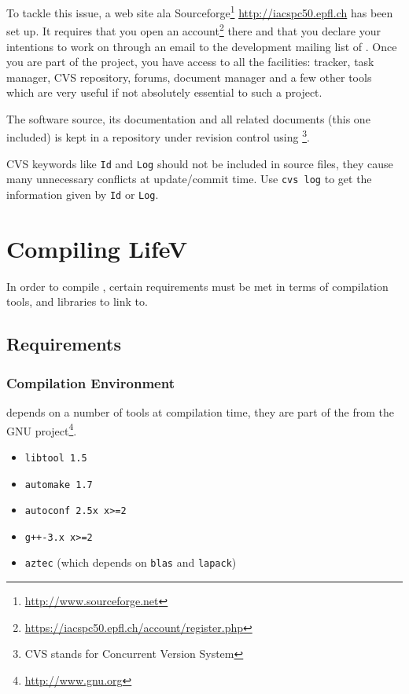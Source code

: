 To tackle this issue, a web site ala Sourceforge\footnote{\url{http://www.sourceforge.net}} \url{http://iacspc50.epfl.ch} has been set up. It requires that you open an account\footnote{\url{https://iacspc50.epfl.ch/account/register.php}} there and that you declare your intentions to work on \lifev through an email to the development mailing list of \lifev. Once you are part of the project, you have access to all the facilities: tracker, task manager, CVS repository, forums, document manager and a few other tools which are very useful if not absolutely essential to such a project.


The software source, its documentation and all related documents (this
one included) is kept in a repository under revision control
using \footnote{CVS
  stands for Concurrent Version System}.

CVS keywords like \verb!Id! and \verb!Log! should not be included in source files,
they cause many unnecessary conflicts at update/commit time. Use 
\verb!cvs log! to get the information given by \verb!Id! or \verb!Log!.

\section{Compiling LifeV}
\label{compile-lifev} 

In order to compile \lifev, certain requirements must be met in terms
of compilation tools, and libraries to link to.

\subsection{Requirements}

\subsubsection{Compilation Environment}

\lifev depends on a number of tools at compilation time, they are part
of the  from the GNU
project\footnote{\url{http://www.gnu.org}}. 

\begin{itemize}
\item \verb!libtool 1.5!
\item \verb!automake 1.7!
\item \verb!autoconf 2.5x x>=2!
\item \verb!g++-3.x x>=2!
\item \verb!aztec! (which depends on \verb!blas! and \verb!lapack!)
\end{itemize} 

